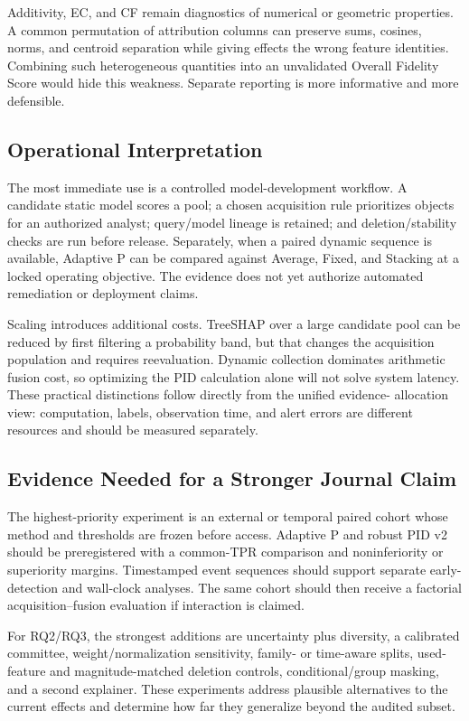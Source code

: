 Additivity, EC, and CF remain diagnostics of numerical or geometric properties.
A common permutation of attribution columns can preserve sums, cosines, norms,
and centroid separation while giving effects the wrong feature identities.
Combining such heterogeneous quantities into an unvalidated Overall Fidelity
Score would hide this weakness. Separate reporting is more informative and more
defensible.

\subsection{Operational Interpretation}

The most immediate use is a controlled model-development workflow. A candidate
static model scores a pool; a chosen acquisition rule prioritizes objects for an
authorized analyst; query/model lineage is retained; and deletion/stability
checks are run before release. Separately, when a paired dynamic sequence is
available, Adaptive P can be compared against Average, Fixed, and Stacking at a
locked operating objective. The evidence does not yet authorize automated
remediation or deployment claims.

Scaling introduces additional costs. TreeSHAP over a large candidate pool can be
reduced by first filtering a probability band, but that changes the acquisition
population and requires reevaluation. Dynamic collection dominates arithmetic
fusion cost, so optimizing the PID calculation alone will not solve system
latency. These practical distinctions follow directly from the unified evidence-
allocation view: computation, labels, observation time, and alert errors are
different resources and should be measured separately.

\subsection{Evidence Needed for a Stronger Journal Claim}

The highest-priority experiment is an external or temporal paired cohort whose
method and thresholds are frozen before access. Adaptive P and robust PID v2
should be preregistered with a common-TPR comparison and noninferiority or
superiority margins. Timestamped event sequences should support separate early-
detection and wall-clock analyses. The same cohort should then receive a
factorial acquisition--fusion evaluation if interaction is claimed.

For RQ2/RQ3, the strongest additions are uncertainty plus diversity, a calibrated
committee, weight/normalization sensitivity, family- or time-aware splits,
used-feature and magnitude-matched deletion controls, conditional/group masking,
and a second explainer. These experiments address plausible alternatives to the
current effects and determine how far they generalize beyond the audited subset.
